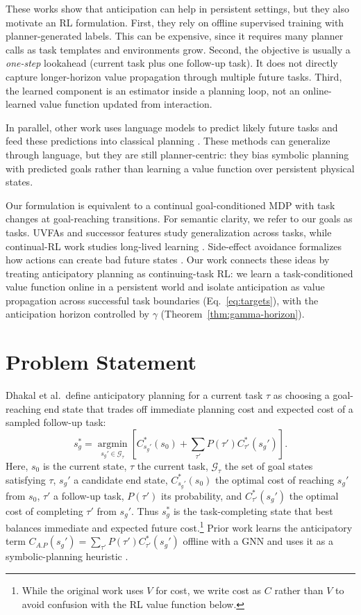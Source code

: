 \documentclass{article}
\begin{document}
These works show that anticipation can help in persistent settings, but they also motivate an RL formulation. First, they rely on offline supervised training with planner-generated labels. This can be expensive, since it requires many planner calls as task templates and environments grow. Second, the objective is usually a \emph{one-step} lookahead (current task plus one follow-up task). It does not directly capture longer-horizon value propagation through multiple future tasks. Third, the learned component is an estimator inside a planning loop, not an online-learned value function updated from interaction.

In parallel, other work uses language models to predict likely future tasks and feed these predictions into classical planning \cite{arora2024anticipate,singh2024anticipate}. These methods can generalize through language, but they are still planner-centric: they bias symbolic planning with predicted goals rather than learning a value function over persistent physical states.

Our formulation is equivalent to a continual goal-conditioned MDP with task changes at goal-reaching transitions. For semantic clarity, we refer to our goals as tasks.
UVFAs \cite{schaul2015uvfa} and successor features \cite{barreto2017successor} study generalization across tasks, while continual-RL work studies long-lived learning \cite{khetarpal2022continual}. Side-effect avoidance formalizes how actions can create bad future states \cite{krakovna2020avoiding}. Our work connects these ideas by treating anticipatory planning as continuing-task RL: we learn a task-conditioned value function online in a persistent world and isolate anticipation as value propagation across successful task boundaries (Eq.~\eqref{eq:targets}), with the anticipation horizon controlled by $\gamma$ (Theorem~\ref{thm:gamma-horizon}).

\section{Problem Statement}
Dhakal et al.\ define anticipatory planning for a current task $\tau$ as choosing a goal-reaching end state that trades off immediate planning cost and expected cost of a sampled follow-up task:
\begin{equation}
\label{eq:dhakal}
s_g^*=\operatorname*{argmin}_{s_g' \in \mathcal{G}_\tau}\left[C^*_{s_g'}(s_0)+\sum_{\tau'} P(\tau')C^*_{\tau'}(s_g')\right].
\end{equation}
Here, $s_0$ is the current state, $\tau$ the current task, $\mathcal{G}_\tau$ the set of goal states satisfying $\tau$, $s_g'$ a candidate end state, $C^*_{s_g'}(s_0)$ the optimal cost of reaching $s_g'$ from $s_0$, $\tau'$ a follow-up task, $P(\tau')$ its probability, and $C^*_{\tau'}(s_g')$ the optimal cost of completing $\tau'$ from $s_g'$. Thus $s_g^*$ is the task-completing state that best balances immediate and expected future cost.\footnote{While the original work uses $V$ for cost, we write cost as $C$ rather than $V$ to avoid confusion with the RL value function below.} Prior work learns the anticipatory term \( C_{A.P}(s_g') = \sum_{\tau'} P(\tau')C^*_{\tau'}(s_g') \) offline with a GNN and uses it as a symbolic-planning heuristic \cite{dhakal2023anticipatory}.
\end{document}

